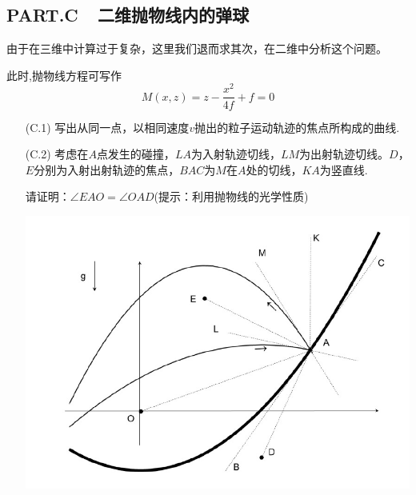 \documentclass{article}
\begin{document}
\subsection*{PART.C\ \ 二维抛物线内的弹球}
由于在三维中计算过于复杂，这里我们退而求其次，在二维中分析这个问题。\par
此时,抛物线方程可写作
\[
M(x,z)=z-\dfrac{x^2}{4f}+f=0
\]

\begin{itemize}
    \item[(C.1)]写出从同一点，以相同速度$v$抛出的粒子运动轨迹的焦点所构成的曲线.
    \item[(C.2)]考虑在$A$点发生的碰撞，$LA$为入射轨迹切线，$LM$为出射轨迹切线。$D$，$E$分别为入射出射轨迹的焦点，$BAC$为$M$在$A$处的切线，$KA$为竖直线.\par
    请证明：$\angle EAO=\angle OAD$(提示：利用抛物线的光学性质)
        \begin{center}
    \includegraphics[scale=0.3]{img/4.jpg}\par    
    \end{center}


\end{itemize}
\end{document}
